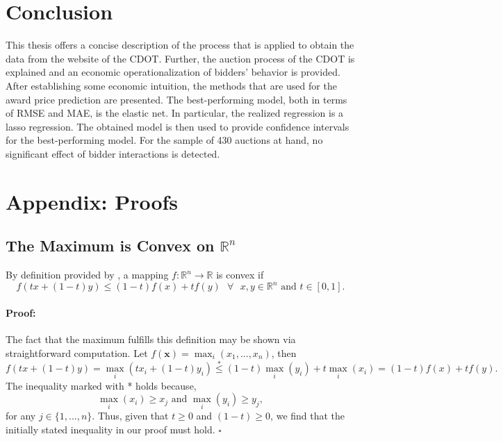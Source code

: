 \documentclass[a4paper,12pt, headsepline]{scrartcl}
\DeclareMathOperator*{\maxA}{max}
\newenvironment{proof}{\paragraph{Proof:}}{\hfill$\square$}
\numberwithin{equation}{section}
\begin{document}
\section{Conclusion}\label{sec:con}
 This thesis offers a concise description of the process that is applied to obtain the data from the website of the CDOT. Further, the auction process of the CDOT is explained and an economic operationalization of bidders' behavior is provided. After establishing some economic intuition, the methods that are used for the award price prediction are presented. The best-performing model, both in terms of RMSE and MAE, is the elastic net. In particular, the realized regression is a lasso regression. The obtained model is then used to provide confidence intervals for the best-performing model. For the sample of 430 auctions at hand, no significant effect of bidder interactions is detected.
 \newpage
 \printbibliography[heading=bibintoc]
 \newpage
 \appendix
  \section{Appendix: Proofs}
 \subsection{The Maximum is Convex on $\mathbb{R}^n$}\label{App:A1}
 By definition provided by \citet{rudin76}, a mapping $f: \mathbb{R}^n \rightarrow \mathbb{R}$ is convex if
 \[
 f(tx+ (1-t)y) \leq (1-t)f(x)+tf(y) \text{ }\forall\text{ } x, y \in \mathbb{R}^n \text{ and } t \in [0, 1].
 \]
 \begin{proof}
 	The fact that the maximum fulfills this definition may be shown via straightforward computation. 
 	Let $f(\bm{x}) = \maxA_i(x_1, ..., x_n)$, then 
 	\[
 	f(tx+ (1-t)y) = \maxA_i(tx_i + (1-t)y_i) \overset{*}{\leq} (1-t)\maxA_i(y_i) + t\maxA_i(x_i) = (1-t)f(x)+tf(y).
 	\]
 	The inequality marked with * holds because,
 	\[
 	\maxA_i(x_i) \geq x_j \text{ and } \maxA_i(y_i) \geq y_j,
 	\]
 	for any $j \in \{1, ..., n\}$. Thus, given that $t \geq 0$ and $(1-t) \geq 0$, we find that the initially stated inequality in our proof must hold.
 \end{proof}
\end{document}
